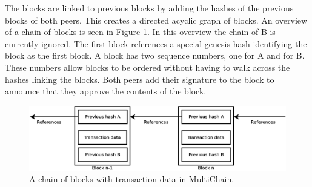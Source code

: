 The blocks are linked to previous blocks by adding the hashes of the previous blocks of both peers.
This creates a directed acyclic graph of blocks.
An overview of a chain of blocks is seen in Figure \ref{fig:transaction-chain}.
In this overview the chain of B is currently ignored.
The first block references a special genesis hash identifying the block as the first block.
A block has two sequence numbers, one for A and for B.
These numbers allow blocks to be ordered without having to walk across the hashes linking the blocks.
Both peers add their signature to the block to announce that they approve the contents of the block.

\begin{figure}
	\centerline{\includegraphics[scale=0.3]{design/figs/transaction-chain.eps}}
	\caption{A chain of blocks with transaction data in MultiChain.}
	\label{fig:transaction-chain}
\end{figure}


